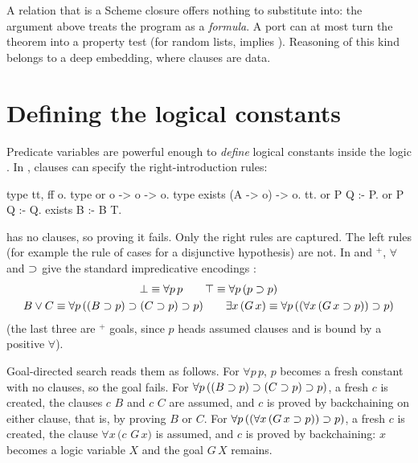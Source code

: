 \begin{kanren}
A relation that is a Scheme closure offers nothing to substitute into: the argument above treats the
program as a \emph{formula}. A port can at most turn the theorem into a property test (for random
lists,  implies ). Reasoning of this kind belongs to a deep
embedding, where clauses are data.
\end{kanren}

\section{Defining the logical constants}\label{sec:hoprog-logconst}

Predicate variables are powerful enough to \emph{define} logical constants inside the logic
. In \hohc{}, clauses can specify the right-introduction rules:
\begin{lprolog}
type tt, ff   o.
type or       o -> o -> o.
type exists   (A -> o) -> o.
tt.                  %
or P Q :- P.         %
or P Q :- Q.
exists B :- B T.     %
\end{lprolog}
 has no clauses, so proving it fails. Only the right rules are captured. The left rules (for
example the rule of cases for a disjunctive hypothesis) are not. In \hohh{} and \hohh$^+$, $\forall$
and $\supset$ give the standard impredicative encodings :
\begin{gather*}
\bot \equiv \forall p\,p \qquad
\top \equiv \forall p\,(p\supset p)\\
B\vee C \equiv \forall p\,((B\supset p)\supset(C\supset p)\supset p)\qquad
\exists x\,(G\,x) \equiv \forall p\,((\forall x\,(G\,x\supset p))\supset p)
\end{gather*}
(the last three are \hohh$^+$ goals, since $p$ heads assumed clauses and is bound by a positive $\forall$).

\begin{tutorial}
Goal-directed search reads them as follows. For $\forall p\,p$, $p$ becomes a fresh constant with no
clauses, so the goal fails. For $\forall p\,((B\supset p)\supset(C\supset p)\supset p)$, a fresh $c$ is created, the
clauses $c$ \lp{:-} $B$ and $c$ \lp{:-} $C$ are assumed, and $c$ is proved by backchaining on either clause,
that is, by proving $B$ or $C$. For $\forall p\,((\forall x\,(G\,x\supset p))\supset p)$, a fresh $c$ is created,
the clause $\forall x\,(c$ \lp{:-} $G\,x)$ is assumed, and $c$ is proved by backchaining: $x$ becomes a logic
variable $X$ and the goal $G\,X$ remains.
\end{tutorial}

